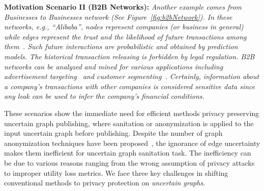 \vspace{2mm}
{\textbf{Motivation Scenario II (B2B Networks): }}
{\em  Another example comes from Businesses to Businesses network (See Figure~\ref{fig:b2bNetwork}). In these networks, e.g., ``Alibaba'', nodes represent companies (or business in general) 
while edges represent the trust and the likelihood of future transactions among them~\cite{Lin_B2B}. Such future interactions are probabilistic and obtained by prediction models. The historical transaction releasing is forbidden by legal regulation. 
B2B networks can be analyzed and mined for various applications including advertisement targeting~\cite{Abrahams20132777} and customer segmenting~\cite{alsina2015targeting}. 
Certainly, information about a company's transactions with other companies is considered sensitive data since any leak can be used to infer the company's financial conditions.
}
 
\vspace{2mm}
These scenarios show the immediate need for efficient methods privacy preserving uncertain graph publishing, where sanitation or anonymization is applied to the input uncertain graph before publishing. Despite the number of graph anonymization techniques have been proposed~\cite{Liu_Towards_2008, Boldi_Injecting_2012,  Mittal_Preserving_2013, Bonchi_Identity_2014}, the ignorance of edge uncertainty makes them inefficient for uncertain graph sanitation task. The inefficiency can be due to various reasons ranging from the wrong assumption of privacy attacks to improper utility loss metrics. We face three key challenges in shifting conventional methods to privacy protection on \emph{uncertain graphs}. 



